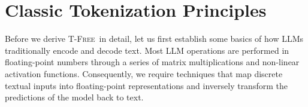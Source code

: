 \documentclass[11pt]{article}
\newcommand\todo[1]{\textcolor{red}{#1}}
\newcommand{\method}{\textsc{T-Free}}
\begin{document}






\section{Classic Tokenization Principles}
\label{sec:background}
Before we derive \method~in detail, let us first establish some basics of how LLMs traditionally encode and decode text. Most LLM operations
are performed in floating-point numbers through a series of matrix multiplications and non-linear activation functions.
Consequently, we require techniques that map discrete textual inputs into floating-point representations and inversely transform the predictions of the model back to text. 
\end{document}
